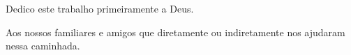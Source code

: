\begin{dedicatoria}
Dedico este trabalho primeiramente a Deus.

Aos nossos familiares e amigos que diretamente ou indiretamente nos ajudaram
nessa caminhada.
\end{dedicatoria}
